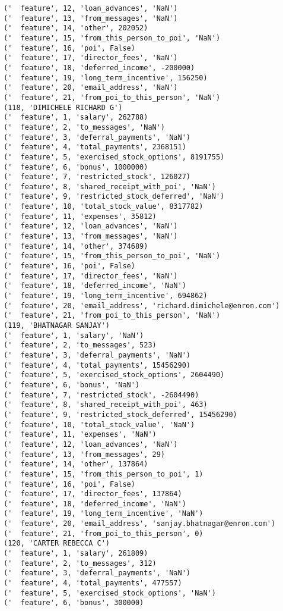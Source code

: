 \begin{verbatim}
('  feature', 12, 'loan_advances', 'NaN')
('  feature', 13, 'from_messages', 'NaN')
('  feature', 14, 'other', 202052)
('  feature', 15, 'from_this_person_to_poi', 'NaN')
('  feature', 16, 'poi', False)
('  feature', 17, 'director_fees', 'NaN')
('  feature', 18, 'deferred_income', -200000)
('  feature', 19, 'long_term_incentive', 156250)
('  feature', 20, 'email_address', 'NaN')
('  feature', 21, 'from_poi_to_this_person', 'NaN')
(118, 'DIMICHELE RICHARD G')
('  feature', 1, 'salary', 262788)
('  feature', 2, 'to_messages', 'NaN')
('  feature', 3, 'deferral_payments', 'NaN')
('  feature', 4, 'total_payments', 2368151)
('  feature', 5, 'exercised_stock_options', 8191755)
('  feature', 6, 'bonus', 1000000)
('  feature', 7, 'restricted_stock', 126027)
('  feature', 8, 'shared_receipt_with_poi', 'NaN')
('  feature', 9, 'restricted_stock_deferred', 'NaN')
('  feature', 10, 'total_stock_value', 8317782)
('  feature', 11, 'expenses', 35812)
('  feature', 12, 'loan_advances', 'NaN')
('  feature', 13, 'from_messages', 'NaN')
('  feature', 14, 'other', 374689)
('  feature', 15, 'from_this_person_to_poi', 'NaN')
('  feature', 16, 'poi', False)
('  feature', 17, 'director_fees', 'NaN')
('  feature', 18, 'deferred_income', 'NaN')
('  feature', 19, 'long_term_incentive', 694862)
('  feature', 20, 'email_address', 'richard.dimichele@enron.com')
('  feature', 21, 'from_poi_to_this_person', 'NaN')
(119, 'BHATNAGAR SANJAY')
('  feature', 1, 'salary', 'NaN')
('  feature', 2, 'to_messages', 523)
('  feature', 3, 'deferral_payments', 'NaN')
('  feature', 4, 'total_payments', 15456290)
('  feature', 5, 'exercised_stock_options', 2604490)
('  feature', 6, 'bonus', 'NaN')
('  feature', 7, 'restricted_stock', -2604490)
('  feature', 8, 'shared_receipt_with_poi', 463)
('  feature', 9, 'restricted_stock_deferred', 15456290)
('  feature', 10, 'total_stock_value', 'NaN')
('  feature', 11, 'expenses', 'NaN')
('  feature', 12, 'loan_advances', 'NaN')
('  feature', 13, 'from_messages', 29)
('  feature', 14, 'other', 137864)
('  feature', 15, 'from_this_person_to_poi', 1)
('  feature', 16, 'poi', False)
('  feature', 17, 'director_fees', 137864)
('  feature', 18, 'deferred_income', 'NaN')
('  feature', 19, 'long_term_incentive', 'NaN')
('  feature', 20, 'email_address', 'sanjay.bhatnagar@enron.com')
('  feature', 21, 'from_poi_to_this_person', 0)
(120, 'CARTER REBECCA C')
('  feature', 1, 'salary', 261809)
('  feature', 2, 'to_messages', 312)
('  feature', 3, 'deferral_payments', 'NaN')
('  feature', 4, 'total_payments', 477557)
('  feature', 5, 'exercised_stock_options', 'NaN')
('  feature', 6, 'bonus', 300000)

\end{verbatim}
